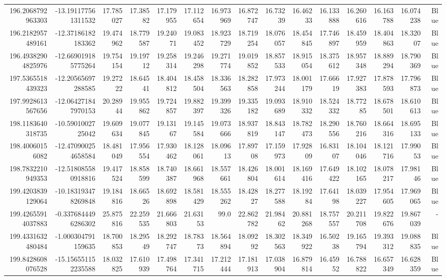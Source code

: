 \begin{center}
\begin{longtable}{rrrrrrrrrrrrrrr}
196.2068792963303 & -13.191177561311532 & 17.785027 & 17.38582 & 17.179955 & 17.112654 & 16.973969 & 16.872747 & 16.73239 & 16.46233 & 16.133888 & 16.260616 & 16.163788 & 16.074238 & Blue \\
196.2182957489161 & -12.37186182183362 & 19.474962 & 18.779587 & 19.24071 & 19.083452 & 18.923729 & 18.719254 & 18.076057 & 18.454845 & 17.746897 & 18.459959 & 18.404863 & 18.32007 & Blue \\
196.49382904825976 & -12.669019185775264 & 19.754154 & 19.19712 & 19.258314 & 19.246298 & 19.271774 & 19.019852 & 18.857533 & 18.915054 & 18.375612 & 18.957348 & 18.889294 & 18.790369 & Blue \\
197.5365518439323 & -12.20565697288585 & 19.27222 & 18.64541 & 18.404812 & 18.458504 & 18.336563 & 18.282858 & 17.973244 & 18.001179 & 17.66619 & 17.927383 & 17.878593 & 17.796873 & Blue \\
197.9928613567656 & -12.064271847970153 & 20.28944 & 19.955862 & 19.724857 & 19.882397 & 19.399326 & 19.335182 & 19.093689 & 18.910332 & 18.524332 & 18.77285 & 18.678501 & 18.610613 & Blue \\
198.1183640318735 & -10.5901002725042 & 19.609634 & 19.077845 & 19.13167 & 19.145584 & 19.073666 & 18.937819 & 18.843147 & 18.782473 & 18.290556 & 18.760216 & 18.664316 & 18.695133 & Blue \\
198.40060156082 & -12.470900254658584 & 18.481049 & 17.956554 & 17.930462 & 18.128061 & 18.09613 & 17.89708 & 17.159973 & 17.92809 & 16.83107 & 18.104046 & 18.121716 & 17.99053 & Blue \\
198.7832210949353 & -12.518085580918816 & 19.417524 & 18.858599 & 18.740387 & 18.661968 & 18.557661 & 18.426804 & 18.001614 & 18.169416 & 17.649422 & 18.102165 & 18.078217 & 17.98146 & Blue \\
199.4203839129064 & -10.183193478269848 & 19.184816 & 18.66526 & 18.692898 & 18.581429 & 18.555262 & 18.42827 & 18.277588 & 18.19284 & 17.64198 & 18.039227 & 17.954605 & 17.969065 & Blue \\
199.42655914037883 & -0.3376844496286302 & 25.875816 & 22.259535 & 21.666803 & 21.63153 & 99.0 & 22.862782 & 21.98462 & 20.881268 & 18.757557 & 20.211708 & 19.822676 & 19.867039 & - \\
199.4331632480484 & -1.000304791159635 & 18.700853 & 18.29549 & 18.292747 & 18.78373 & 18.564894 & 18.09292 & 18.302563 & 18.349922 & 16.50238 & 19.165794 & 19.393312 & 19.088835 & Blue \\
199.8428608076528 & -15.156551152235588 & 18.032825 & 17.610939 & 17.498764 & 17.341715 & 17.212444 & 17.181913 & 17.038904 & 16.879814 & 16.45952 & 16.788822 & 16.657349 & 16.628359 & Blue \\

\end{longtable}
\end{center}
